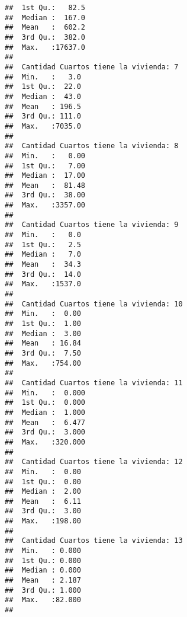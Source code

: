 \documentclass[11pt,]{article}
\begin{document}
\begin{verbatim}
##  1st Qu.:   82.5                      
##  Median :  167.0                      
##  Mean   :  602.2                      
##  3rd Qu.:  382.0                      
##  Max.   :17637.0                      
##                                       
##  Cantidad Cuartos tiene la vivienda: 7
##  Min.   :   3.0                       
##  1st Qu.:  22.0                       
##  Median :  43.0                       
##  Mean   : 196.5                       
##  3rd Qu.: 111.0                       
##  Max.   :7035.0                       
##                                       
##  Cantidad Cuartos tiene la vivienda: 8
##  Min.   :   0.00                      
##  1st Qu.:   7.00                      
##  Median :  17.00                      
##  Mean   :  81.48                      
##  3rd Qu.:  38.00                      
##  Max.   :3357.00                      
##                                       
##  Cantidad Cuartos tiene la vivienda: 9
##  Min.   :   0.0                       
##  1st Qu.:   2.5                       
##  Median :   7.0                       
##  Mean   :  34.3                       
##  3rd Qu.:  14.0                       
##  Max.   :1537.0                       
##                                       
##  Cantidad Cuartos tiene la vivienda: 10
##  Min.   :  0.00                        
##  1st Qu.:  1.00                        
##  Median :  3.00                        
##  Mean   : 16.84                        
##  3rd Qu.:  7.50                        
##  Max.   :754.00                        
##                                        
##  Cantidad Cuartos tiene la vivienda: 11
##  Min.   :  0.000                       
##  1st Qu.:  0.000                       
##  Median :  1.000                       
##  Mean   :  6.477                       
##  3rd Qu.:  3.000                       
##  Max.   :320.000                       
##                                        
##  Cantidad Cuartos tiene la vivienda: 12
##  Min.   :  0.00                        
##  1st Qu.:  0.00                        
##  Median :  2.00                        
##  Mean   :  6.11                        
##  3rd Qu.:  3.00                        
##  Max.   :198.00                        
##                                        
##  Cantidad Cuartos tiene la vivienda: 13
##  Min.   : 0.000                        
##  1st Qu.: 0.000                        
##  Median : 0.000                        
##  Mean   : 2.187                        
##  3rd Qu.: 1.000                        
##  Max.   :82.000                        
##                                        

\end{verbatim}
\end{document}
